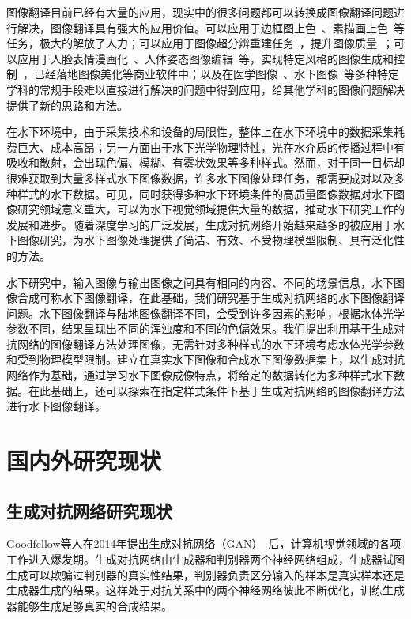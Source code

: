 图像翻译目前已经有大量的应用，现实中的很多问题都可以转换成图像翻译问题进行解决，图像翻译具有强大的应用价值。可以应用于边框图上色~\cite{ghosh2019interactive}、素描画上色~\cite{cao2017unsupervised,nazeri2018image}等任务，极大的解放了人力；可以应用于图像超分辨重建任务~\cite{ledig2017photo,zhang2019ranksrgan,anokhin2020high}，提升图像质量~\cite{wang2019discriminative,bowles2018gan}；可以应用于人脸表情漫画化~\cite{yi2019apdrawinggan,shi2019warpgan}、人体姿态图像编辑~\cite{chan2019everybody,cao2019improving}等，实现特定风格的图像生成和控制~\cite{karras2019style}，已经落地图像美化等商业软件中；以及在医学图像~\cite{zhou2019prior,lee2019collagan}、水下图像~\cite{uplavikar2019all,li2020underwater}等多种特定学科的常规手段难以直接进行解决的问题中得到应用，给其他学科的图像问题解决提供了新的思路和方法。

在水下环境中，由于采集技术和设备的局限性，整体上在水下环境中的数据采集耗费巨大、成本高昂；另一方面由于水下光学物理特性，光在水介质的传播过程中有吸收和散射，会出现色偏、模糊、有雾状效果等多种样式。然而，对于同一目标却很难获取到大量多样式水下图像数据，许多水下图像处理任务，都需要成对以及多种样式的水下数据。可见，同时获得多种水下环境条件的高质量图像数据对水下图像研究领域意义重大，可以为水下视觉领域提供大量的数据，推动水下研究工作的发展和进步。随着深度学习的广泛发展，生成对抗网络开始越来越多的被应用于水下图像研究，为水下图像处理提供了简洁、有效、不受物理模型限制、具有泛化性的方法。

水下研究中，输入图像与输出图像之间具有相同的内容、不同的场景信息，水下图像合成可称水下图像翻译，在此基础，我们研究基于生成对抗网络的水下图像翻译问题。水下图像翻译与陆地图像翻译不同，会受到许多因素的影响，根据水体光学参数不同，结果呈现出不同的浑浊度和不同的色偏效果。我们提出利用基于生成对抗网络的图像翻译方法处理图像，无需针对多种样式的水下环境考虑水体光学参数和受到物理模型限制。建立在真实水下图像和合成水下图像数据集上，以生成对抗网络作为基础，通过学习水下图像成像特点，将给定的数据转化为多种样式水下数据。在此基础上，还可以探索在指定样式条件下基于生成对抗网络的图像翻译方法进行水下图像翻译。

\section{国内外研究现状}
\subsection{生成对抗网络研究现状}
Goodfellow等人\cite{goodfellow2014generative}在2014年提出生成对抗网络（GAN）~后，计算机视觉领域的各项工作进入爆发期。生成对抗网络由生成器和判别器两个神经网络组成，生成器试图生成可以欺骗过判别器的真实性结果，判别器负责区分输入的样本是真实样本还是生成器生成的结果。这样处于对抗关系中的两个神经网络彼此不断优化，训练生成器能够生成足够真实的合成结果。

